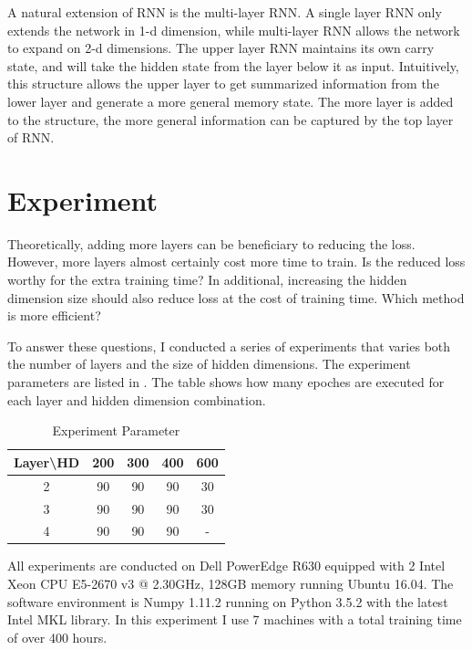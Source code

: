 \documentclass{article}
\begin{document}
A natural extension of RNN is the multi-layer RNN. A single layer RNN only
extends the network in 1-d dimension, while multi-layer RNN allows the network
to expand on 2-d dimensions. The upper layer RNN maintains its own carry state, 
and will take the hidden state from the layer below it as input. Intuitively,
this structure allows the upper layer to get summarized information from the 
lower layer and generate a more general memory state. The more layer is added
to the structure, the more general information can be captured by the top layer
of RNN.

\section*{Experiment}

Theoretically, adding more layers can be beneficiary to reducing the loss. However,
more layers almost certainly cost more time to train. Is the reduced loss worthy
for the extra training time? In additional, increasing the hidden dimension size
should also reduce loss at the cost of training time. Which method is more efficient?

To answer these questions, I conducted a series of experiments that varies both
the number of layers and the size of hidden dimensions. The experiment
parameters are listed in . The table shows how many epoches are 
executed for each layer and hidden dimension combination.

\renewcommand{\arraystretch}{1.2}
\begin{table}
\centering
\begin{tabular}{c|c|c|c|c}
\textbf{Layer\textbackslash HD} & 200 & 300 & 400 & 600\\
\hline
2 & 90& 90& 90& 30 \\
\hline
3 & 90& 90& 90& 30 \\
\hline
4 & 90& 90& 90& - \\
\end{tabular}
\caption{Experiment Parameter}
\label{tab:param}
\end{table}

All experiments are conducted on Dell PowerEdge R630 equipped with 2 Intel Xeon
CPU E5-2670 v3 @ 2.30GHz, 128GB memory running Ubuntu 16.04. The software 
environment is Numpy 1.11.2 running on Python 3.5.2 with the latest Intel MKL
library. In this experiment I use 7 machines with a total training time of 
over 400 hours.

\begin{figure}
\centering
{}
\end{figure}
\end{document}
